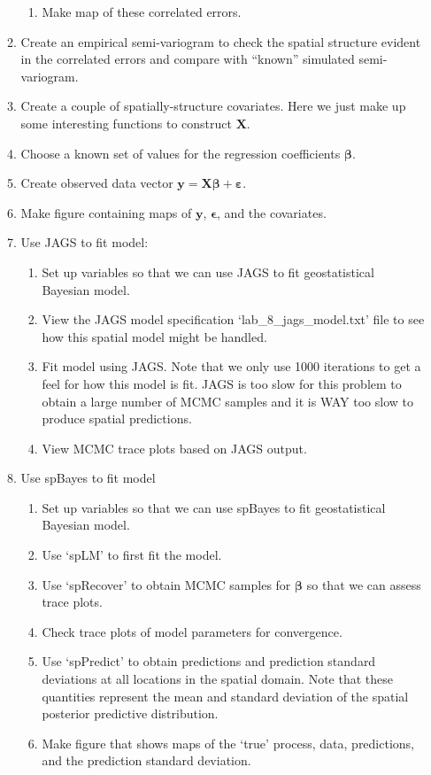 \documentclass[12pt]{article}
\begin{document}
\begin{enumerate}
\begin{enumerate}
\begin{enumerate}
      \item Make map of these correlated errors.
    \end{enumerate}
  \item Create an empirical semi-variogram to check the spatial structure evident in the correlated errors and compare with ``known'' simulated semi-variogram. 
  \item Create a couple of spatially-structure covariates.  Here we just make up some interesting functions to construct $\mathbf{X}$.
  \item Choose a known set of values for the regression coefficients $\boldsymbol\beta$.  
  \item Create observed data vector $\mathbf{y}=\mathbf{X}\boldsymbol\beta + \boldsymbol\varepsilon$. 
  \item Make figure containing maps of $\mathbf{y}$, $\boldsymbol\epsilon$, and the covariates.  
  \item Use JAGS to fit model:
  \begin{enumerate}
    \item Set up variables so that we can use JAGS to fit geostatistical Bayesian model.   
    \item View the JAGS model specification `lab\_8\_jags\_model.txt' file to see how this spatial model might be handled.  
    \item Fit model using JAGS.  Note that we only use 1000 iterations to get a feel for how this model is fit.  JAGS is too slow for this problem to obtain a large number of MCMC samples and it is WAY too slow to produce spatial predictions.  
    \item View MCMC trace plots based on JAGS output. 
  \end{enumerate}
  \item Use spBayes to fit model 
  \begin{enumerate}
    \item Set up variables so that we can use spBayes to fit geostatistical Bayesian model.
    \item Use `spLM' to first fit the model. 
    \item Use `spRecover' to obtain MCMC samples for $\boldsymbol\beta$ so that we can assess trace plots.
    \item Check trace plots of model parameters for convergence.  
    \item Use `spPredict' to obtain predictions and prediction standard deviations at all locations in the spatial domain.  Note that these quantities represent the mean and standard deviation of the spatial posterior predictive distribution.
    \item Make figure that shows maps of the `true' process, data, predictions, and the prediction standard deviation.   
  \end{enumerate}
  \end{enumerate}
\end{enumerate}
\end{document}
